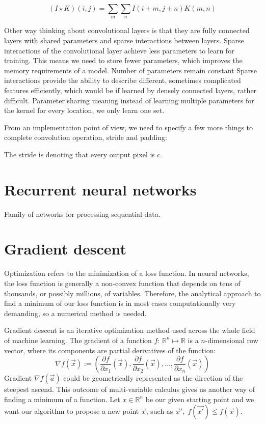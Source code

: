 \begin{equation}
    (I \star K)(i,j) = \sum_m\sum_n I(i+m,j+n)K(m,n)
\end{equation}

Other way thinking about convolutional layers is that they are fully connected layers with shared parameters and sparse interactions between layers. Sparse interactions of the convolutional layer achieve less parameters to learn for training. This means we need to store fewer parameters, which improves the memory requirements of a model. Number of parameters remain constant Sparse interactions provide the ability to describe different, sometimes complicated features efficiently, which would be if learned by densely connected layers, rather difficult.  Parameter sharing meaning instead of learning multiple parameters for the kernel for every location, we only learn one set. 

From an implementation point of view, we need to specify a few more things to complete convolution operation, stride and padding:
\par The stride is denoting that every output pixel is c 









\section{Recurrent neural networks}
Family of networks for processing sequential data. 












\section{Gradient descent}

Optimization refers to the minimization of a loss function. In neural networks, the loss function is generally a non-convex function that depends on tens of thousands, or possibly millions, of variables. Therefore, the analytical approach to find a minimum of our loss function is in most cases computationally very demanding, so a numerical method is needed. 
\par Gradient descent is an iterative optimization method used across the whole field of machine learning. The gradient of a function $f$: $\mathbb{R}^n \mapsto \mathbb{R}$ is a $n$-dimensional row vector, where its components are partial derivatives of the function: 
$$\nabla f(\Vec{x}) := (\frac{\partial f}{\partial x_1}(\Vec{x}), \frac{\partial f}{\partial x_2}(\Vec{x}), \dots, \frac{\partial f}{\partial x_n}(\Vec{x}))$$ 
Gradient $\nabla f(\Vec{a})$ could be geometrically represented as the direction of the steepest ascend. This outcome of multi-variable calculus gives us another way of finding a minimum of a function. Let $x \in \mathbb{R}^n$ be our given starting point and we want our algorithm to propose a new point $\Vec{x}$, such as $\Vec{x}', \; f(\Vec{x'}) \le f(\Vec{x})$. 

